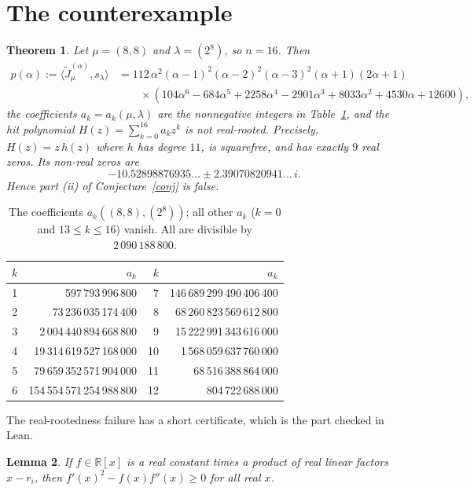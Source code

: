 \documentclass[11pt]{article}
\newtheorem{theorem}{Theorem}
\newtheorem{lemma}[theorem]{Lemma}
\theoremstyle{remark}
\newcommand{\Jt}{\widetilde{J}}
\begin{document}
\section{The counterexample}

\begin{theorem}\label{thm}
Let $\mu=(8,8)$ and $\lambda=(2^8)$, so $n=16$. Then
\begin{align*}
p(\alpha):=\langle \Jt_\mu^{(\alpha)}, s_\lambda\rangle
 &= 112\,\alpha^2(\alpha-1)^2(\alpha-2)^2(\alpha-3)^2(\alpha+1)(2\alpha+1)\\
 &\qquad\times(104\alpha^6-684\alpha^5+2258\alpha^4-2901\alpha^3+8033\alpha^2+4530\alpha+12600),
\end{align*}
the coefficients $a_k=a_k(\mu,\lambda)$ are the nonnegative integers in Table~\ref{tab}, and the hit polynomial
$H(z)=\sum_{k=0}^{16}a_kz^k$ is not real-rooted. Precisely, $H(z)=z\,h(z)$ where $h$ has degree $11$, is
squarefree, and has exactly $9$ real zeros. Its non-real zeros are
\[
 -10.52898876935\ldots \pm 2.39070820941\ldots\, i .
\]
Hence part \textup{(ii)} of Conjecture~\ref{conj} is false.
\end{theorem}

\begin{table}[h]
\centering
\begin{tabular}{rr@{\qquad}rr}
\toprule
$k$ & $a_k$ & $k$ & $a_k$\\
\midrule
1 & 597\,793\,996\,800 & 7 & 146\,689\,299\,490\,406\,400\\
2 & 73\,236\,035\,174\,400 & 8 & 68\,260\,823\,569\,612\,800\\
3 & 2\,004\,440\,894\,668\,800 & 9 & 15\,222\,991\,343\,616\,000\\
4 & 19\,314\,619\,527\,168\,000 & 10 & 1\,568\,059\,637\,760\,000\\
5 & 79\,659\,352\,571\,904\,000 & 11 & 68\,516\,388\,864\,000\\
6 & 154\,554\,571\,254\,988\,800 & 12 & 804\,722\,688\,000\\
\bottomrule
\end{tabular}
\caption{The coefficients $a_k((8,8),(2^8))$; all other $a_k$ ($k=0$ and $13\le k\le16$) vanish. All
are divisible by $2\,090\,188\,800$.}\label{tab}
\end{table}

The real-rootedness failure has a short certificate, which is the part checked in Lean.

\begin{lemma}\label{lem}
If $f\in\mathbb R[x]$ is a real constant times a product of real linear factors $x-r_i$, then
$f'(x)^2-f(x)f''(x)\ge 0$ for all real $x$.
\end{lemma}
\end{document}
